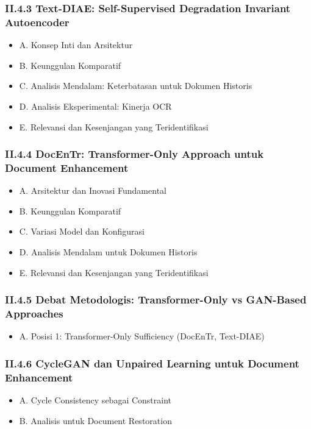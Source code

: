 \documentclass[11pt,a4paper]{article}
\begin{document}
\subsubsection*{II.4.3 Text-DIAE: Self-Supervised Degradation Invariant Autoencoder}
\begin{itemize}[label={}, leftmargin=2em]
    \item A. Konsep Inti dan Arsitektur
    \item B. Keunggulan Komparatif
    \item C. Analisis Mendalam: Keterbatasan untuk Dokumen Historis
    \item D. Analisis Eksperimental: Kinerja OCR
    \item E. Relevansi dan Kesenjangan yang Teridentifikasi
\end{itemize}

\subsubsection*{II.4.4 DocEnTr: Transformer-Only Approach untuk Document Enhancement}
\begin{itemize}[label={}, leftmargin=2em]
    \item A. Arsitektur dan Inovasi Fundamental
    \item B. Keunggulan Komparatif
    \item C. Variasi Model dan Konfigurasi
    \item D. Analisis Mendalam untuk Dokumen Historis
    \item E. Relevansi dan Kesenjangan yang Teridentifikasi
\end{itemize}

\subsubsection*{II.4.5 Debat Metodologis: Transformer-Only vs GAN-Based Approaches}
\begin{itemize}[label={}, leftmargin=2em]
    \item A. Posisi 1: Transformer-Only Sufficiency (DocEnTr, Text-DIAE)
\end{itemize}

\subsubsection*{II.4.6 CycleGAN dan Unpaired Learning untuk Document Enhancement}
\begin{itemize}[label={}, leftmargin=2em]
    \item A. Cycle Consistency sebagai Constraint
    \item B. Analisis untuk Document Restoration
\end{itemize}
\end{document}
